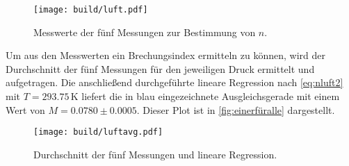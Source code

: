 \begin{figure}
    \centering
    \texttt{[image: build/luft.pdf]}
    \caption{Messwerte der fünf Messungen zur Bestimmung von $n$.}
    \label{fig:allefüreinen}
\end{figure}
Um aus den Messwerten ein Brechungsindex ermitteln zu können, wird der Durchschnitt der fünf Messungen für den jeweiligen Druck ermittelt und aufgetragen. Die anschließend durchgeführte lineare Regression nach \autoref{eq:nluft2} mit $T=293.75\,\unit{\kelvin}$
liefert die in blau eingezeichnete Ausgleichsgerade mit einem Wert von $M=0.0780\pm 0.0005$.
Dieser Plot ist in \autoref{fig:einerfüralle} dargestellt.
\begin{figure}
    \centering
    \texttt{[image: build/luftavg.pdf]}
    \caption{Durchschnitt der fünf Messungen und lineare Regression.}
    \label{fig:einerfüralle}
\end{figure}
